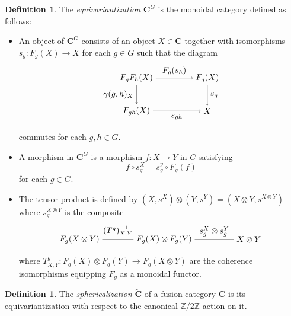 \documentclass[a4paper]{article}
\theoremstyle{plain}
\theoremstyle{definition}
\newtheorem{defn}[thm]{Definition}
\newcommand\ba{\begin{aligned}}
\newcommand\ea{\end{aligned}}
\newcommand{\cat}{\mathbf}
\begin{document}
\begin{defn} The {\em equivariantization} $\cat{C}^G$ is the monoidal  category defined as follows:
\begin{itemize}
\item An object of $\cat{C}^G$ consists of an object $X \in \cat{C}$ together with isomorphisms $s_g : F_g(X) \rightarrow X$ for each $g \in G$ such that the diagram
\begin{equation} \label{Gequivob}
\ba
\begin{tikzpicture}[xscale=3, yscale=1.4]
\node (1) at (0,0) {$F_g F_h(X)$};
\node (2) at (1,0) {$F_g(X)$};
\node (3) at (0,-1) {$F_{gh} (X)$};
\node (4) at (1,-1) {$X$};
\draw[->] (1) -- node[above] {$F_g(s_h)$} (2);
\draw[->] (2) -- node[right] {$s_g$} (4);
\draw[->] (3) -- node[below] {$s_{gh}$} (4);
\draw[->] (1) -- node[left] {$\gamma(g,h)_X$} (3);
\end{tikzpicture}
\ea
\end{equation}
commutes for each $g,h \in G$.
\item A morphism in $\cat{C}^G$ is a morphism $f : X \rightarrow Y$ in $C$ satisfying 
\begin{equation} \label{morphismCG}
f \circ s^X_g = s^y_g \circ F_g(f)
\end{equation}
 for each $g \in G$. 
\item The tensor product is defined by $(X, s^X) \otimes (Y, s^Y) = (X \otimes Y, s^{X\otimes Y})$ where $s^{X \otimes Y}_g$ is the composite
\begin{equation}
\ba \begin{tikzpicture}[xscale=3.6]
 \node (1) at (0,0) {$F_g(X \otimes Y)$};
 \node (2) at (1,0) {$F_g(X) \otimes F_g(Y)$};
 \node (3) at (2,0) {$X \otimes Y$}; 
 \draw (1) -- node[above]{$(T^g)^{-1}_{X,Y}$} (2);
 \draw (2) -- node[above] {$s^X_g \otimes s^Y_g$} (3);
  \end{tikzpicture} \ea \, 
\end{equation}
where $T^g_{X,Y} : F_g(X) \otimes F_g(Y) \rightarrow F_g(X \otimes Y)$ are the coherence isomorphisms equipping $F_g$ as a monoidal functor.
\end{itemize}
\end{defn}

\begin{defn} The {\em sphericalization} $\tilde{\cat{C}}$ of a fusion category
$\cat{C}$ is its equivariantization with respect to the canonical $\mathbb{Z}
/ 2 \mathbb{Z}$ action on it.
\end{defn}
 
\end{document}
